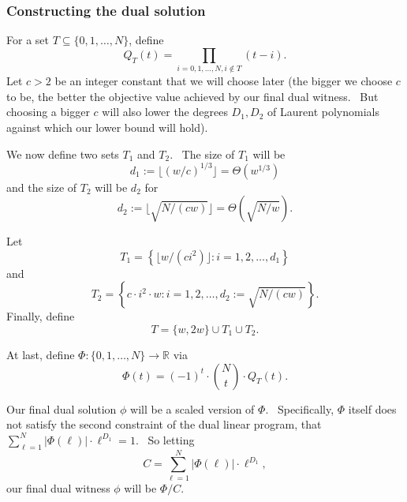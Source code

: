 \subsubsection{Constructing the dual solution}
\label{duallpsec}

For a set $T\subseteq \{0,1,\dots ,N\}$, define
\begin{equation}
Q_{T}(t)=\prod_{i=0,1,\dots ,N,i\not\in T}(t-i).
\end{equation}
Let $c>2$ be an integer constant that we will choose later (the bigger we choose $c$
to be, the better the objective value achieved by our final dual witness. \
But choosing a bigger $c$ will also lower the degrees $D_{1},D_{2}$ of
Laurent polynomials against which our lower bound will hold).

We now define two sets $T_{1}$ and $T_{2}$. \ The size of $T_{1}$ will be
\begin{equation}
d_{1}:=\lfloor \left( w/c\right) ^{1/3}\rfloor =\Theta \left( w^{1/3}\right)
\end{equation}
and the size of $T_{2}$ will be $d_{2}$ for
\begin{equation}
d_{2}:=\lfloor \sqrt{N/(cw)}\rfloor =\Theta \left( \sqrt{N/w}\right) .
\end{equation}
%
%

Let
\begin{equation}
T_1 = \left\{\lfloor w/(c i^2) \rfloor \colon i=1, 2, \dots, d_1\right\}
\end{equation}
and
\begin{equation}
T_2 = \left\{c \cdot i^2 \cdot w \colon i = 1, 2, \dots, d_2:=\sqrt{N/(cw)}
\right\}.
\end{equation}
Finally, define
\begin{equation}
T = \{w, 2w\} \cup T_1 \cup T_2.
\end{equation}

At last, define $\Phi \colon \{0, 1, \dots, N\} \to \mathbb{R}$ via
\begin{equation}  \label{phidef}
\Phi(t) = (-1)^t \cdot \binom{N}{t} \cdot Q_T(t).
\end{equation}

Our final dual solution $\phi $ will be a scaled version of $\Phi $. \
Specifically, $\Phi $ itself does not satisfy the second constraint of the
dual linear program, that $\sum_{\ell =1}^{N}|\Phi (\ell )|\cdot \ell
^{D_{1}}=1$. \ So letting
\begin{equation}
C=\sum_{\ell =1}^{N}|\Phi (\ell )|\cdot \ell ^{D_{1}},  \label{Cdef}
\end{equation}
our final dual witness $\phi $ will be $\Phi /C$.

